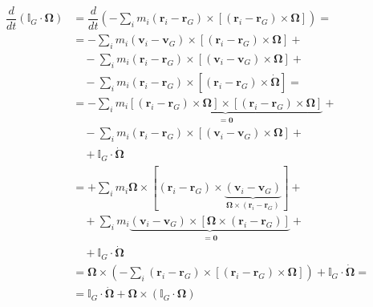 \begin{equation}
\begin{aligned}
    \dfrac{d}{dt} \left( \mathbb{I}_G \cdot \mathbf{\Omega} \right) & =
    \dfrac{d}{dt} \left( - \sum_i m_i (\mathbf{r}_i - \mathbf{r}_G ) \times \left[ (\mathbf{r}_i - \mathbf{r}_G ) \times \mathbf{\Omega} \right]  \right) = \\
    & = - \sum_i  m_i (\mathbf{v}_i - \mathbf{v}_G ) \times \left[ (\mathbf{r}_i - \mathbf{r}_G ) \times \mathbf{\Omega} \right] + \\
    & \quad - \sum_i  m_i (\mathbf{r}_i - \mathbf{r}_G ) \times \left[ (\mathbf{v}_i - \mathbf{v}_G ) \times \mathbf{\Omega} \right] + \\
    & \quad - \sum_i  m_i (\mathbf{r}_i - \mathbf{r}_G ) \times \left[ (\mathbf{r}_i - \mathbf{r}_G ) \times \dot{\mathbf{\Omega}} \right] = \\
    & = - \sum_i  m_i \underbrace{\left[ (\mathbf{r}_i - \mathbf{r}_G ) \times \mathbf{\Omega} \right]  \times \left[ (\mathbf{r}_i - \mathbf{r}_G ) \times \mathbf{\Omega} \right]}_{= \mathbf{0}} + \\
    & \quad - \sum_i  m_i (\mathbf{r}_i - \mathbf{r}_G ) \times \left[ (\mathbf{v}_i - \mathbf{v}_G ) \times \mathbf{\Omega} \right] + \\
    & \quad + \mathbb{I}_G \cdot \dot{\mathbf{\Omega}} \\
    & = + \sum_i  m_i \mathbf{\Omega} \times [ (\mathbf{r}_i - \mathbf{r}_G) \times \underbrace{(\mathbf{v}_i - \mathbf{v}_G)}_{\mathbf{\Omega} \times (\mathbf{r}_i - \mathbf{r}_G) } ] + \\
    & \quad + \sum_i  m_i \underbrace{(\mathbf{v}_i - \mathbf{v}_G) \times [ \mathbf{\Omega} \times (\mathbf{r}_i - \mathbf{r}_G ) ]}_{= \mathbf{0}}  + \\
    & \quad + \mathbb{I}_G \cdot \dot{\mathbf{\Omega}} \\
    & = \mathbf{\Omega} \times \left( - \sum_i (\mathbf{r}_i - \mathbf{r}_G) \times [ (\mathbf{r}_i - \mathbf{r}_G) \times \mathbf{\Omega} ] \right) + \mathbb{I}_G \cdot \dot{\mathbf{\Omega}} = \\
    & = \mathbb{I}_G \cdot \dot{\mathbf{\Omega}} + \mathbf{\Omega} \times \left( \mathbb{I}_G \cdot \mathbf{\Omega} \right)
\end{aligned}
\end{equation}

